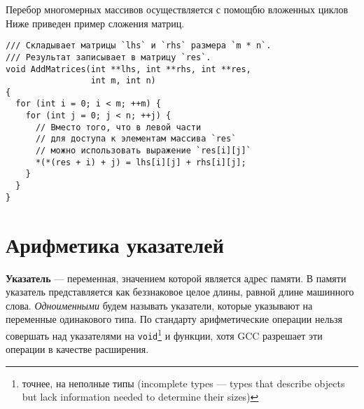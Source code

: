 Перебор многомерных массивов осуществляется с помощбю вложенных циклов
Ниже приведен пример сложения матриц.

\begin{verbatim}
/// Складывает матрицы `lhs` и `rhs` размера `m * n`.
/// Результат записывает в матрицу `res`.
void AddMatrices(int **lhs, int **rhs, int **res,
                 int m, int n)
{
  for (int i = 0; i < m; ++m) {
    for (int j = 0; j < n; ++j) {
      // Вместо того, что в левой части
      // для доступа к элементам массива `res`
      // можно использовать выражение `res[i][j]`
      *(*(res + i) + j) = lhs[i][j] + rhs[i][j];
    }
  }
}
\end{verbatim}

\section{Арифметика указателей}
\label{sec:ptr_arithm}
\textbf{Указатель} --- переменная, значением которой является адрес памяти.
В памяти указатель представляется как беззнаковое целое длины, равной длине
машинного слова.
\textit{Одноименными} будем называть указатели, которые указывают на переменные
одинакового типа. По стандарту арифметические операции нельзя совершать над 
указателями на \verb|void|\footnote{точнее, на неполные типы (incomplete types ---
types that describe objects but lack information needed to determine their sizes)}
и функции, хотя GCC разрешает эти операции в качестве расширения.

